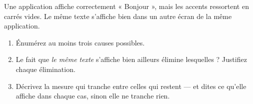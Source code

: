 \begin{nklogique}
Une application affiche correctement « Bonjour », mais les accents ressortent en
carrés vides. Le même texte s'affiche bien dans un autre écran de la même
application.

\begin{enumerate}
\item Énumérez au moins trois causes possibles.
\item Le fait que \emph{le même texte} s'affiche bien ailleurs élimine
      lesquelles ? Justifiez chaque élimination.
\item Décrivez la mesure qui tranche entre celles qui restent --- et dites ce
      qu'elle affiche dans chaque cas, sinon elle ne tranche rien.
\end{enumerate}
\end{nklogique}
